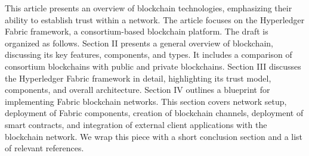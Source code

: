 \documentclass[conference]{IEEEtran}
\begin{document}
This article presents an overview of blockchain technologies, emphasizing their ability to establish trust within a network. The article focuses on the Hyperledger Fabric framework, a consortium-based blockchain platform. The draft is organized as follows. Section II presents a general overview of blockchain, discussing its key features, components, and types. It includes a comparison of consortium blockchains with public and private blockchains. Section III discusses the Hyperledger Fabric framework in detail, highlighting its trust model, components, and overall architecture. Section IV outlines a blueprint for implementing Fabric blockchain networks. This section covers network setup, deployment of Fabric components, creation of blockchain channels, deployment of smart contracts, and integration of external client applications with the blockchain network. We wrap this piece with a short conclusion section and a list of relevant references. 
\end{document}
